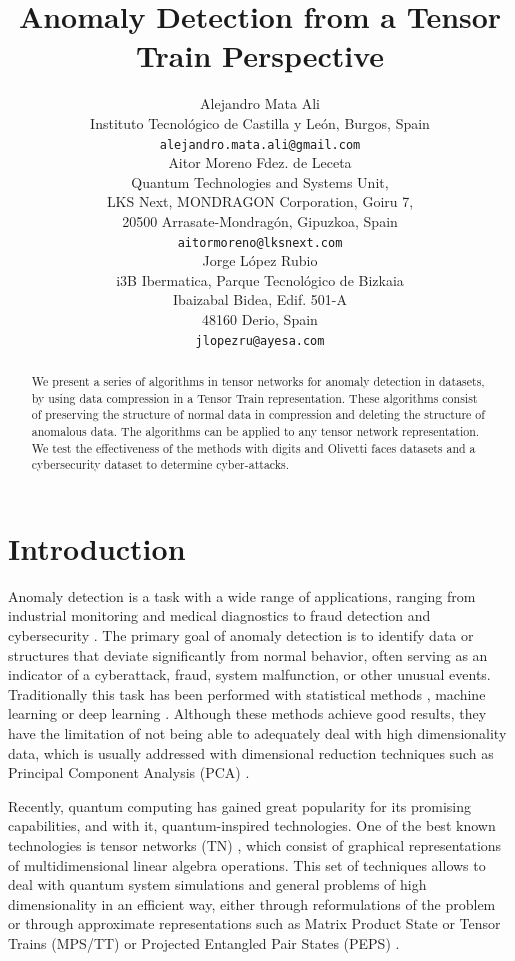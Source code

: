 \documentclass{article}
\title{Anomaly Detection from a Tensor Train Perspective}
\author{
  Alejandro Mata Ali \\
  Instituto Tecnológico de Castilla y León, Burgos, Spain\\
  \texttt{alejandro.mata.ali@gmail.com} \\
   \And
  Aitor Moreno Fdez. de Leceta \\
  Quantum Technologies and Systems Unit,\\
  LKS Next, MONDRAGON Corporation, Goiru 7,\\
  20500 Arrasate-Mondragón, Gipuzkoa, Spain\\
  \texttt{aitormoreno@lksnext.com} \\
   \And
  Jorge López Rubio \\
  i3B Ibermatica, Parque Tecnológico de Bizkaia \\
  Ibaizabal Bidea, Edif. 501-A \\
  48160 Derio, Spain\\
  \texttt{jlopezru@ayesa.com} \\
}
\begin{document}
\maketitle

\begin{abstract}
We present a series of algorithms  in tensor networks for anomaly detection in datasets, by using data compression in a Tensor Train representation. These algorithms consist of preserving the structure of normal data in compression and deleting the structure of anomalous data. The algorithms can be applied to any tensor network representation. We test the effectiveness of the methods with digits and Olivetti faces datasets and a cybersecurity dataset to determine cyber-attacks.
\end{abstract}


\section{Introduction}
Anomaly detection is a task with a wide range of applications, ranging from industrial monitoring \cite{Industrial_Anomaly} and medical diagnostics \cite{Medical_anomaly} to fraud detection \cite{Fraud_Anomaly} and cybersecurity \cite{Ciber_anomaly}. The primary goal of anomaly detection is to identify data or structures that deviate significantly from normal behavior, often serving as an indicator of a cyberattack, fraud, system malfunction, or other unusual events. Traditionally this task has been performed with statistical methods \cite{Statistical_Anomaly}, machine learning \cite{ML_Anomaly} or deep learning \cite{Deep_Anomaly}. Although these methods achieve good results, they have the limitation of not being able to adequately deal with high dimensionality data, which is usually addressed with dimensional reduction techniques such as Principal Component Analysis (PCA) \cite{PCA}.

Recently, quantum computing has gained great popularity for its promising capabilities, and with it, quantum-inspired technologies. One of the best known technologies is tensor networks (TN) \cite{TensorNetwork}, which consist of graphical representations of multidimensional linear algebra operations. This set of techniques allows to deal with quantum system simulations and general problems of high dimensionality in an efficient way, either through reformulations of the problem or through approximate representations such as Matrix Product State or Tensor Trains (MPS/TT) \cite{MPS1,Oseledets2011} or Projected Entangled Pair States (PEPS) \cite{MPS2}.
\end{document}
